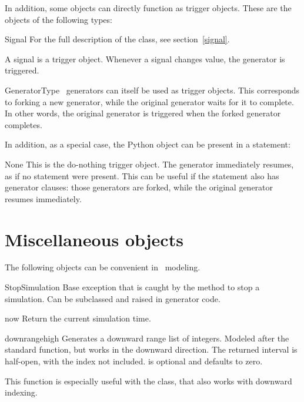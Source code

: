 In addition, some objects can directly function as trigger
objects. These are the objects of the following types:

\begin{datadesc}{Signal}
For the full description of the  class, see
section~\ref{signal}.

A signal is a trigger object. Whenever a signal changes value, the
generator is triggered.
\end{datadesc}

\begin{datadesc}{GeneratorType}
\myhdl\ generators can itself be used as trigger objects. 
This corresponds to forking a new generator, while the original
generator waits for it to complete.  In other words, the original
generator is triggered when the forked generator completes.
\end{datadesc}

In addition, as a special case, the Python  object can be
present in  a  statement:

\begin{datadesc}{None}
This is the do-nothing trigger object. The generator immediately
resumes, as if no  statement were present. This can be
useful if the  statement also has generator clauses: those
generators are forked, while the original generator resumes
immediately.

\end{datadesc}



\section{Miscellaneous objects}

The following objects can be convenient in \myhdl\ modeling.

\begin{excclassdesc}{StopSimulation}{}
Base exception that is caught by the  method to
stop a simulation. Can be subclassed and raised in generator code.
\end{excclassdesc}

\begin{funcdesc}{now}{}
Return the current simulation time.
\end{funcdesc}

\begin{funcdesc}{downrange}{high }
Generates a downward range list of integers. Modeled after the
standard  function, but works in the downward
direction. The returned interval is half-open, with the 
index not included.  is optional and defaults to zero.

This function is especially useful with the  class, that
also works with downward indexing.
\end{funcdesc}

